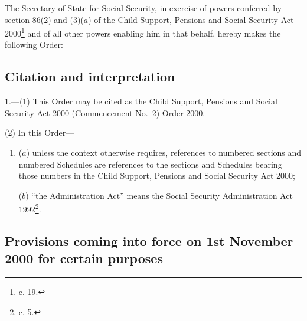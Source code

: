 \documentclass[12pt,a4paper]{article}
\title{\regstitle}
\author{S.I. 2000 No. 2950 (C.87)}
\date{Made 31st October 2000}
\begin{document}
\maketitle

\noindent
The Secretary of State for Social Security, in exercise of powers conferred by section 86(2) and (3)($a$)  of the Child Support, Pensions and Social Security Act 2000\footnote{ c. 19.} and of all other powers enabling him in that behalf, hereby makes the following Order: 

{\sloppy

\tableofcontents

}

\bigskip

\setcounter{secnumdepth}{-2}

\subsection[1. Citation and interpretation]{Citation and interpretation}

1.---(1)  This Order may be cited as the Child Support, Pensions and Social Security Act 2000 (Commencement No.\ 2) Order 2000.

(2) In this Order—
\begin{enumerate}\item[]
($a$) unless the context otherwise requires, references to numbered sections and numbered Schedules are references to the sections and Schedules bearing those numbers in the Child Support, Pensions and Social Security Act 2000;

($b$) “the Administration Act” means the Social Security Administration Act 1992\footnote{ c. 5.}.
\end{enumerate}

\subsection[2. Provisions coming into force on 1st November 2000 for certain purposes]{Provisions coming into force on 1st November 2000 for certain purposes}
\end{document}
